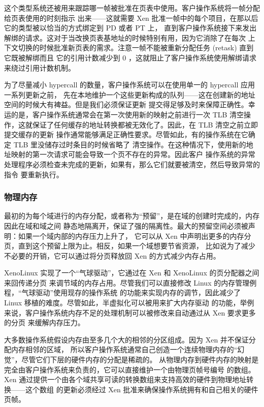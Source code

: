 这个类型系统还被用来跟踪哪一帧被批准在页表中使用。客户操作系统将一帧分配给页表使用的时刻指示
出来——这就需要 Xen 批准一帧中的每个项目，在那以后它的类型被以恰当的方式绑定到 PD 或者 PT 上，
直到客户操作系统接下来发出解绑的请求。这对于当改换页表基地址的时候特别有用，因为它消除了在每次
上下文切换的时候批准新页表的需求。注意一帧不能被重新分配任务 (retask) 直到它既被解绑而且
它的引用计数减少到 0 ，这就阻止了客户操作系统使用解绑请求来绕过引用计数机制。

为了尽量减小 hypercall 的数量，客户操作系统可以在使用单一的 hypercall 应用一系列更新之前，
先在本地维护一个这些更新构成的队列——这在创建新的地址空间的时候大有裨益。但是我们必须保证更新
提交得足够及时来保障正确性。幸运的是，客户操作系统通常会在第一次使用新的映射之前进行一次 TLB
清空操作，这就保证了任何缓存的地址转换都被无效化了。因此，在 TLB 清空之前立即提交缓存的更新
操作通常能够满足正确性要求。尽管如此，有的操作系统在它确定 TLB 里没储存过时条目的时候省略了
清空操作。在这种情况下，使用新的地址映射的第一次请求可能会导致一个页不存在的异常。因此客户
操作系统的异常处理程序必须检查未完成的更新，如果有，那么它们就要被清空，然后导致异常的指令
要重新执行。

\subsubsection{物理内存}

最初的为每个域进行的内存分配，或者称为“预留”，是在域的创建时完成的，内存因此在域和域之间
静态地隔离开，保证了强的隔离性。最大的预留空间必须被声明：如果一个域内部的内存压力上升了，
它可以从 Xen 中声明出更多的内存分页，直到这个预留上限为止。相反，如果一个域想要节省资源，
比如说为了减少不必要的开销，它可以通过将分页释放回 Xen 的方式减少内存占用。

XenoLinux 实现了一个“气球驱动”，它通过在 Xen 和 XenoLinux 的页分配器之间来回传递分页
来调节域的内存占用。尽管我们可以直接修改 Linux 的内存管理例程，“气球驱动”使用现存的操作系统
的功能来实现内存的调节，因此减少了 Linux 移植的难度。尽管如此，半虚拟化可以被用来扩大内存驱动
的功能，举例来说，客户操作系统内存不足的处理机制可以被修改来自动通过从 Xen 要求更多的分页
来缓解内存压力。

大多数操作系统假设内存由至多几个大的相邻的分区组成。因为 Xen 并不保证分配内存相邻的区域，
所以客户操作系统通常自己创造一个连续物理内存的“幻觉”，尽管它们下层的硬件内存的分配是稀疏的。
从物理内存到硬件内存的映射是完全由客户操作系统来负责的，它可以直接维护一个由物理页帧号编号
的数组。Xen 通过提供一个由各个域共享可读的转换数组来支持高效的硬件到物理地址转换——这个数组
的更新必须经过 Xen 批准来确保操作系统拥有和自己相关的硬件页帧。

